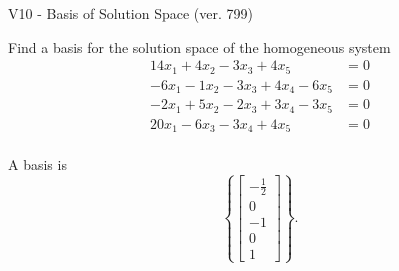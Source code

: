 \begin{exercise}
  \begin{exerciseTitle}V10 - Basis of Solution Space (ver. 799)\end{exerciseTitle}
  \begin{exerciseStatement}
    Find a basis for the solution space of the homogeneous system 
\begin{align*}
 14 x_ 1 + 4 x_ 2 -3 x_ 3 + 4 x_ 5 &= 0  \\ 
  -6 x_ 1 -1 x_ 2 -3 x_ 3 + 4 x_ 4 -6 x_ 5 &= 0  \\ 
  -2 x_ 1 + 5 x_ 2 -2 x_ 3 + 3 x_ 4 -3 x_ 5 &= 0  \\ 
  20 x_ 1 -6 x_ 3 -3 x_ 4 + 4 x_ 5 &= 0  \\ 
 \end{align*}


 
  \end{exerciseStatement}

  \begin{exerciseAnswer}
   A basis is   
\[\left\{\left[\begin{array}{c}
-\frac{1}{2} \\
0 \\
-1 \\
0 \\
1
\end{array}\right]\right\}.\]

  


  \end{exerciseAnswer}
\end{exercise}